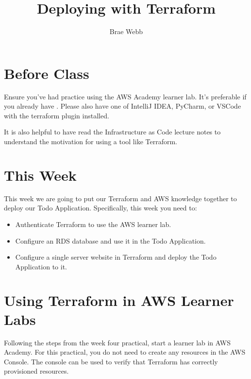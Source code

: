\documentclass{csse4400}
\title{Deploying with Terraform}
\author{Brae Webb}
\date{\week{3}}
\begin{document}
\maketitle

\section{Before Class}
Ensure you've had practice using the AWS Academy learner lab.
It's preferable if you already have .
Please also have one of IntelliJ IDEA, PyCharm, or VSCode with the terraform plugin installed.

\noindent It is also helpful to have read the Infrastructure as Code lecture notes to understand the motivation for using a tool like Terraform.

\section{This Week}
This week we are going to put our Terraform and AWS knowledge together to deploy our Todo Application.
Specifically, this week you need to:
\begin{itemize}
    \item Authenticate Terraform to use the AWS learner lab.
    \item Configure an RDS database and use it in the Todo Application.
    \item Configure a single server website in Terraform and deploy the Todo Application to it.
\end{itemize}

\section{Using Terraform in AWS Learner Labs}
Following the steps from the week four practical, start a learner lab in AWS Academy.
For this practical, you do not need to create any resources in the AWS Console.
The console can be used to verify that Terraform has correctly provisioned resources.
\end{document}
